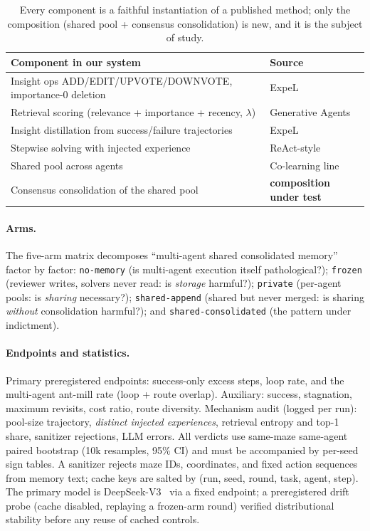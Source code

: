\documentclass[11pt]{article}
\begin{document}
\begin{table}[t]
\centering
\caption{Every component is a faithful instantiation of a published method; only the
composition (shared pool + consensus consolidation) is new, and it is the subject of study.}
\label{tab:components}
\begin{tabular}{ll}
\toprule
Component in our system & Source \\
\midrule
Insight ops ADD/EDIT/UPVOTE/DOWNVOTE, importance-0 deletion & ExpeL~\citep{zhao2024expel} \\
Retrieval scoring (relevance + importance + recency, $\lambda$) & Generative Agents~\citep{park2023generative} \\
Insight distillation from success/failure trajectories & ExpeL~\citep{zhao2024expel} \\
Stepwise solving with injected experience & ReAct-style~\citep{yao2023react} \\
Shared pool across agents & Co-learning line~\citep{qian2024colearning,liu2025mael} \\
Consensus consolidation of the shared pool & \textbf{composition under test} \\
\bottomrule
\end{tabular}
\end{table}

\paragraph{Arms.} The five-arm matrix decomposes ``multi-agent shared consolidated memory''
factor by factor: \texttt{no-memory} (is multi-agent execution itself pathological?);
\texttt{frozen} (reviewer writes, solvers never read: is \emph{storage} harmful?);
\texttt{private} (per-agent pools: is \emph{sharing} necessary?); \texttt{shared-append}
(shared but never merged: is sharing \emph{without} consolidation harmful?); and
\texttt{shared-consolidated} (the pattern under indictment).

\paragraph{Endpoints and statistics.} Primary preregistered endpoints: success-only excess
steps, loop rate, and the multi-agent ant-mill rate (loop + route overlap). Auxiliary:
success, stagnation, maximum revisits, cost ratio, route diversity. Mechanism audit (logged
per run): pool-size trajectory, \emph{distinct injected experiences}, retrieval entropy and
top-1 share, sanitizer rejections, LLM errors. All verdicts use same-maze same-agent paired
bootstrap (10k resamples, 95\% CI) and must be accompanied by per-seed sign tables. A
sanitizer rejects maze IDs, coordinates, and fixed action sequences from memory text; cache
keys are salted by (run, seed, round, task, agent, step). The primary model is
DeepSeek-V3~\citep{deepseek2024v3} via a fixed endpoint; a preregistered drift probe (cache
disabled, replaying a frozen-arm round) verified distributional stability before any reuse of
cached controls.
\end{document}
